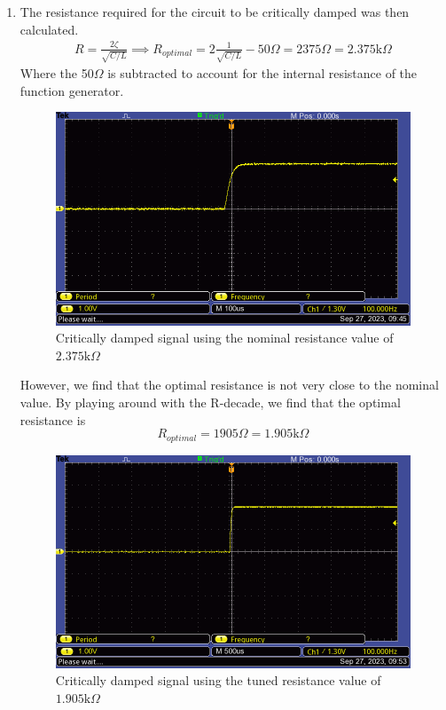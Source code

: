 \begin{enumerate}
    \item The resistance required for the circuit to be critically damped was then calculated.
          \begin{equation}
              \begin{gathered}
                  R = \frac{2\zeta}{\sqrt{C/L}} \implies
                  R_{optimal} = 2\frac{1}{\sqrt{C/L}} - 50\Omega = 2375 \Omega = 2.375 \text{k}\Omega
              \end{gathered}
          \end{equation}
          Where the 50$\Omega$ is subtracted to account for the internal resistance of the function generator.

          \begin{figure}[H]
              \centering
              \includegraphics[width=0.8\linewidth]{images/critically_damped_nominal_value.png}
              \caption{Critically damped signal using the nominal resistance value of $2.375\text{k}\Omega$}
              \label{fig:critically_damped_nominal}
          \end{figure}

          However, we find that the optimal resistance is not very close to the nominal value. By playing around with the R-decade, we find that the optimal resistance is
          \begin{equation}
              R_{optimal} = 1905\Omega = 1.905\text{k}\Omega
          \end{equation}

          \begin{figure}[H]
              \centering
              \includegraphics[width=0.6\linewidth]{images/critically_damped.png}
              \caption{Critically damped signal using the tuned resistance value of $1.905\text{k}\Omega$}
              \label{fig:critically_damped_optimal}
          \end{figure}


\end{enumerate}
